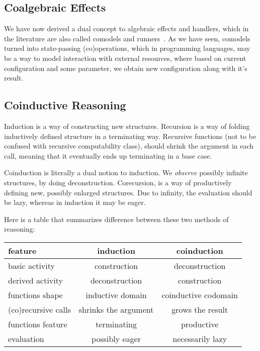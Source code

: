 \documentclass[declaration,shortabstract]{iithesis}
\theoremstyle{definition} \newtheorem{definition}{Definition}[chapter]
\theoremstyle{remark} \newtheorem{remark}[definition]{Observation}
\theoremstyle{plain} \newtheorem{theorem}[definition]{Theorem}
\theoremstyle{plain} \newtheorem{lemma}[definition]{Lemma}
\begin{document}
    \subsection{Coalgebraic Effects}

    We have now derived a dual concept to algebraic effects and handlers, which
    in the literature are also called comodels and runners~\cite{runners-uustalu, runners-in-action}.
    As we have seen, comodels turned into state-passing (co)operations, which
    in programming languages, may be a way to model interaction with external
    resources, where based on current configuration and some parameter, we
    obtain new configuration along with it's result.

    \subsection{Coinductive Reasoning}\label{subsec:coinduction}

    Induction is a way of constructing new structures. Recursion is a way of
    folding inductively defined structure in a terminating way. Recursive
    functions (not to be confused with recursive computability class), should
    shrink the argument in each call, meaning that it eventually ends up
    terminating in a base case.

    Coinduction is literally a dual notion to induction. We \textit{observe} possibly
    infinite structures, by doing deconstruction. Corecursion, is a way
    of productively defining new, possibly enlarged structures. Due to infinity,
    the evaluation should be lazy, whereas in induction it may be eager.

    Here is a table that summarizes difference between these two methods of reasoning:

    \begin{center}
    \begin{tabular}{lcc}
    \toprule

    \textbf{feature}             & \textbf{induction}            & \textbf{coinduction}          \\
    \midrule

    basic activity      & construction          & deconstruction \\
    \midrule

    derived activity    & deconstruction       & construction         \\
    \midrule

    functions shape     & inductive domain     & coinductive codomain \\
    \midrule

    (co)recursive calls& shrinks the argument & grows the result     \\
    \midrule

    functions feature   & terminating          & productive           \\
    \midrule

    evaluation          & possibly eager       & necessarily lazy     \\
    \bottomrule

    \end{tabular}
    \end{center}
\end{document}
